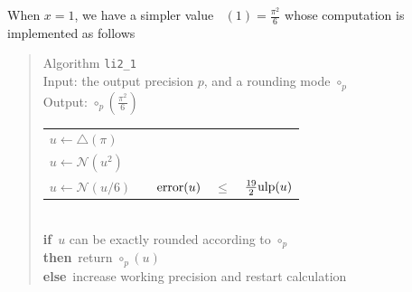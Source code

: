 \documentclass[12pt]{amsart}
\DeclareMathOperator{\LiTwo}{Li_2}
\def\n{\textnormal}
\def\pinf{\bigtriangleup}
\def\ulp{{\rm ulp}}
\def\N{{\mathcal N}}
\def\If{{\bf if}}
\def\then{{\bf then}}
\def\Else{{\bf else}}
\begin{document}
When $x=1$, we have a simpler value $\LiTwo(1) = \frac{\pi^2}{6}$ whose
computation is implemented as follows

\begin{quote}
Algorithm {\tt li2\_1}\\
Input: the output precision $p$, and a rounding mode $\circ_p$ \\
Output: $\circ_p(\frac{\pi^2}{6})$ \\
\begin{tabular}{l c r c l}
$u \leftarrow \pinf(\pi)$ \\
$u \leftarrow \N(u^2)$ \\
$u \leftarrow \N(u/6)$ & &
$\n{error}(u) $ & $ \leq $ & $ \frac{19}{2}\ulp(u)$\\
\end{tabular}\\
\If\ $u$ can be exactly rounded according to $\circ_p$\\
\then\ return $\circ_p(u)$\\
\Else\ increase working precision and restart calculation
\end{quote}
\end{document}
